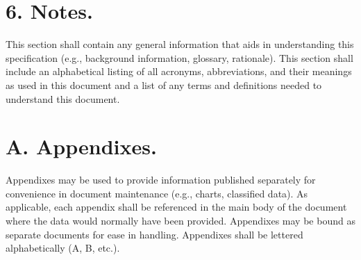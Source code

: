 \section{6. Notes.}

This section shall contain any general information that aids in
understanding this specification (e.g., background information,
glossary, rationale). This section shall include an alphabetical listing
of all acronyms, abbreviations, and their meanings as used in this
document and a list of any terms and definitions needed to understand
this document.

\section{A. Appendixes.}

Appendixes may be used to provide information published separately for
convenience in document maintenance (e.g., charts, classified data). As
applicable, each appendix shall be referenced in the main body of the
document where the data would normally have been provided. Appendixes
may be bound as separate documents for ease in handling. Appendixes
shall be lettered alphabetically (A, B, etc.).
